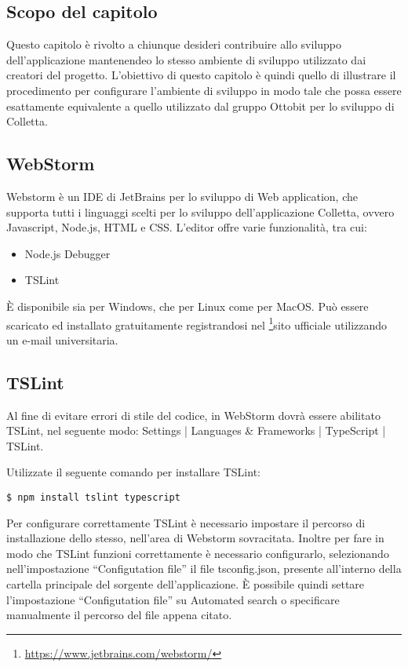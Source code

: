 \subsection{Scopo del capitolo}
Questo capitolo è rivolto a chiunque desideri contribuire allo sviluppo dell'applicazione mantenendeo lo stesso ambiente di sviluppo utilizzato dai creatori del progetto.
L'obiettivo di questo capitolo è quindi quello di illustrare il procedimento per configurare l'ambiente di sviluppo in modo tale che possa essere esattamente equivalente a quello utilizzato dal gruppo Ottobit per lo sviluppo di Colletta.

\subsection{WebStorm}
Webstorm è un IDE di JetBrains per lo sviluppo di Web application, che supporta tutti i linguaggi scelti per lo sviluppo dell'applicazione Colletta, ovvero Javascript, Node.js, HTML e CSS.
L'editor offre varie funzionalità, tra cui:
\begin{itemize}
	\item Node.js Debugger
	\item TSLint
\end{itemize}
È disponibile sia per Windows, che per Linux come per MacOS.
Può essere scaricato ed installato gratuitamente registrandosi nel \footnote{\url{https://www.jetbrains.com/webstorm/}}sito ufficiale utilizzando un e-mail universitaria.

\subsection{TSLint}
Al fine di evitare errori di stile del codice, in WebStorm dovrà essere abilitato TSLint, nel seguente modo: Settings | Languages \& Frameworks | TypeScript | TSLint.

Utilizzate il seguente comando per installare TSLint:
\begin{center}
		\begin{minipage}{0.5\textwidth}
			\begin{lstlisting}[caption=Installazione per l'analisi statica,numbers=none]			
		$ npm install tslint typescript
			\end{lstlisting}
		\end{minipage}
\end{center}
Per configurare correttamente TSLint è necessario impostare il percorso di installazione dello stesso, nell'area di Webstorm sovracitata.
Inoltre per fare in modo che TSLint funzioni correttamente è necessario configurarlo, selezionando nell'impostazione ``Configutation file'' il file tsconfig.json, presente all'interno della cartella principale del sorgente dell'applicazione. È possibile quindi settare l'impostazione ``Configutation file'' su Automated search o specificare manualmente il percorso del file appena citato.

